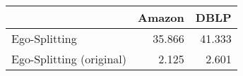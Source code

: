 \begin{tabular}{lrr}
\toprule
{} & Amazon &   DBLP \\
\midrule
Ego-Splitting            & 35.866 & 41.333 \\
Ego-Splitting (original) &  2.125 &  2.601 \\
\bottomrule
\end{tabular}
